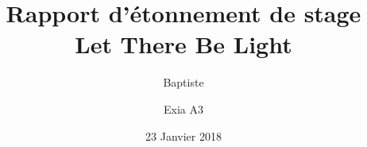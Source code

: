 \documentclass{article}
\title{Rapport d'étonnement de stage \\ \large Let There Be Light}
\date{23 Janvier 2018}
\author{Baptiste \bsc{Saclier} \and Exia A3}
\begin{document}
\vspace{\fill}

\maketitle

\vspace{\fill}
\clearpage

\tableofcontents
\clearpage


\end{document}
